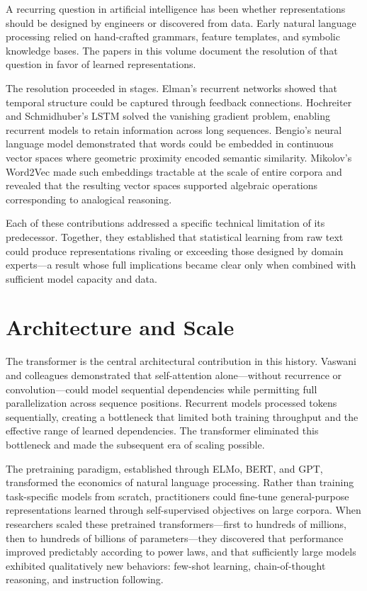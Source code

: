 A recurring question in artificial intelligence has been whether representations should be designed by engineers or discovered from data. Early natural language processing relied on hand-crafted grammars, feature templates, and symbolic knowledge bases. The papers in this volume document the resolution of that question in favor of learned representations.

The resolution proceeded in stages. Elman's recurrent networks showed that temporal structure could be captured through feedback connections. Hochreiter and Schmidhuber's LSTM solved the vanishing gradient problem, enabling recurrent models to retain information across long sequences. Bengio's neural language model demonstrated that words could be embedded in continuous vector spaces where geometric proximity encoded semantic similarity. Mikolov's Word2Vec made such embeddings tractable at the scale of entire corpora and revealed that the resulting vector spaces supported algebraic operations corresponding to analogical reasoning.

Each of these contributions addressed a specific technical limitation of its predecessor. Together, they established that statistical learning from raw text could produce representations rivaling or exceeding those designed by domain experts---a result whose full implications became clear only when combined with sufficient model capacity and data.

\section*{Architecture and Scale}

The transformer is the central architectural contribution in this history. Vaswani and colleagues demonstrated that self-attention alone---without recurrence or convolution---could model sequential dependencies while permitting full parallelization across sequence positions. Recurrent models processed tokens sequentially, creating a bottleneck that limited both training throughput and the effective range of learned dependencies. The transformer eliminated this bottleneck and made the subsequent era of scaling possible.

The pretraining paradigm, established through ELMo, BERT, and GPT, transformed the economics of natural language processing. Rather than training task-specific models from scratch, practitioners could fine-tune general-purpose representations learned through self-supervised objectives on large corpora. When researchers scaled these pretrained transformers---first to hundreds of millions, then to hundreds of billions of parameters---they discovered that performance improved predictably according to power laws, and that sufficiently large models exhibited qualitatively new behaviors: few-shot learning, chain-of-thought reasoning, and instruction following.

